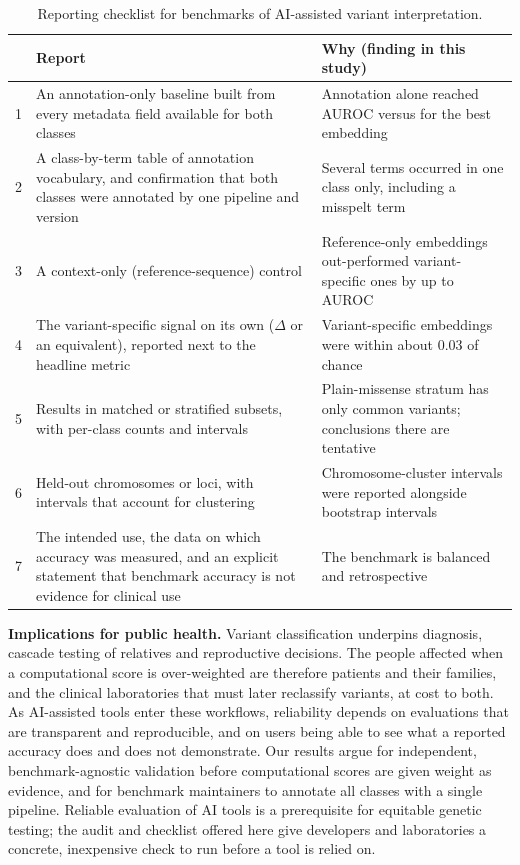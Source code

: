 \documentclass[11pt]{article}
\newcommand{\Dlt}{\Delta}
\begin{document}
\begin{table}[t]
\centering\small
\begin{tabularx}{\linewidth}{@{}c>{\raggedright\arraybackslash}p{4.9cm}>{\raggedright\arraybackslash}X@{}}
\toprule
 & Report & Why (finding in this study)\\\midrule
1 & An annotation-only baseline built from every metadata field available for both classes & Annotation alone reached AUROC \MetaAll{} versus \DnbRef{} for the best embedding\\
2 & A class-by-term table of annotation vocabulary, and confirmation that both classes were annotated by one pipeline and version & Several terms occurred in one class only, including a misspelt term\\
3 & A context-only (reference-sequence) control & Reference-only embeddings out-performed variant-specific ones by up to \DnbSens{} AUROC\\
4 & The variant-specific signal on its own ($\Dlt$ or an equivalent), reported next to the headline metric & Variant-specific embeddings were within about 0.03 of chance\\
5 & Results in matched or stratified subsets, with per-class counts and intervals & Plain-missense stratum has only \PureStratC{} common variants; conclusions there are tentative\\
6 & Held-out chromosomes or loci, with intervals that account for clustering & Chromosome-cluster intervals were reported alongside bootstrap intervals\\
7 & The intended use, the data on which accuracy was measured, and an explicit statement that benchmark accuracy is not evidence for clinical use & The benchmark is balanced and retrospective\\
\bottomrule
\end{tabularx}
\caption{Reporting checklist for benchmarks of AI-assisted variant interpretation.}
\label{tab:checklist}
\end{table}

\textbf{Implications for public health.} Variant classification underpins diagnosis, cascade testing of relatives and reproductive decisions. The people affected when a computational score is over-weighted are therefore patients and their families, and the clinical laboratories that must later reclassify variants, at cost to both. As AI-assisted tools enter these workflows, reliability depends on evaluations that are transparent and reproducible, and on users being able to see what a reported accuracy does and does not demonstrate. Our results argue for independent, benchmark-agnostic validation before computational scores are given weight as evidence, and for benchmark maintainers to annotate all classes with a single pipeline. Reliable evaluation of AI tools is a prerequisite for equitable genetic testing; the audit and checklist offered here give developers and laboratories a concrete, inexpensive check to run before a tool is relied on.
\end{document}
